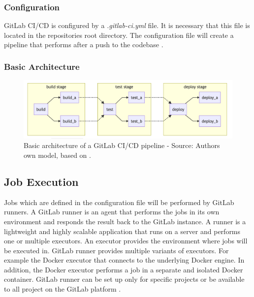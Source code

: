 \subsubsection{Configuration}
GitLab CI/CD is configured by a \textit{.gitlab-ci.yml} file. It is necessary that this file is located in the repositories root directory.
The configuration file will create a pipeline that performs after a push to the codebase \cite{Gitlab2020Docs}.


\subsubsection{Basic Architecture}

\begin{figure}[h]
\centering
\includegraphics[scale=1]{images/04_technical_background/gitlab/basic-pipeline-architecture}
\caption{Basic architecture of a GitLab CI/CD pipeline - Source: Authors own model, based on \cite{Gitlab2020Docs}.}
\label{fig:gitlab-basic_pipeline}
\end{figure}


\subsection{Job Execution}
Jobs which are defined in the configuration file will be performed by GitLab runners.
A GitLab runner is an agent that performs the jobs in its own environment and responds the result back to the GitLab instance. A runner is a lightweight and highly scalable application that runs on a server and performs one or multiple executors.
An executor provides the environment where jobs will be executed in. GitLab runner provides multiple variants of executors.
For example the Docker executor that connects to the underlying Docker engine. In addition, the Docker executor performs a job in a separate and isolated Docker container.
GitLab runner can be set up only for specific projects or be available to all project on the GitLab platform \cite{Gitlab2020Docs}.


